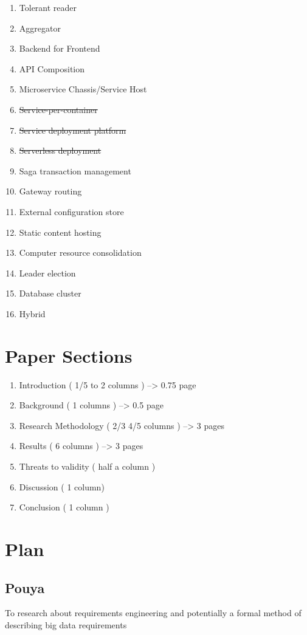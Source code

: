 \documentclass{article}
\theoremstyle{mytheoremstyle}
\theoremstyle{mytheoremstyle}
\theoremstyle{myproblemstyle}
\begin{document}
\begin{enumerate}
  \item Tolerant reader 
  \item Aggregator 
  \item Backend for Frontend 
  \item API Composition 
  \item Microservice Chassis/Service Host   
  \item \sout{Service-per-container}
  \item \sout{Service deployment platform}
  \item \sout{Serverless deployment} 
  \item Saga transaction management
  \item Gateway routing 
  \item External configuration store 
  \item Static content hosting 
  \item Computer resource consolidation 
  \item Leader election 
  \item Database cluster
  \item Hybrid
\end{enumerate}




\section{Paper Sections}

\begin{enumerate}
  \item Introduction ( 1/5 to 2 columns ) --> 0.75 page 
  \item Background ( 1 columns ) --> 0.5 page
  \item Research Methodology ( 2/3 4/5 columns ) --> 3 pages 
  \item Results ( 6 columns ) --> 3 pages 
  \item Threats to validity ( half a column ) 
  \item Discussion ( 1 column)
  \item Conclusion ( 1 column )
\end{enumerate}

\section{Plan}

\subsection{Pouya}
To research about requirements engineering and potentially a formal method of describing big data requirements 
\end{document}
